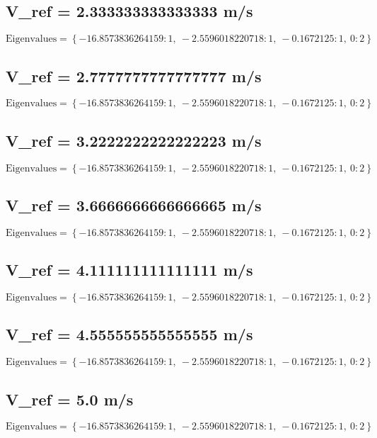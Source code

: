 \documentclass{article}
\begin{document}
\subsection*{V_ref = 2.333333333333333 m/s}
\begin{equation}
\text{Eigenvalues} = \left\{ -16.8573836264159 : 1, \  -2.5596018220718 : 1, \  -0.1672125 : 1, \  0 : 2\right\}
\end{equation}
\subsection*{V_ref = 2.7777777777777777 m/s}
\begin{equation}
\text{Eigenvalues} = \left\{ -16.8573836264159 : 1, \  -2.5596018220718 : 1, \  -0.1672125 : 1, \  0 : 2\right\}
\end{equation}
\subsection*{V_ref = 3.2222222222222223 m/s}
\begin{equation}
\text{Eigenvalues} = \left\{ -16.8573836264159 : 1, \  -2.5596018220718 : 1, \  -0.1672125 : 1, \  0 : 2\right\}
\end{equation}
\subsection*{V_ref = 3.6666666666666665 m/s}
\begin{equation}
\text{Eigenvalues} = \left\{ -16.8573836264159 : 1, \  -2.5596018220718 : 1, \  -0.1672125 : 1, \  0 : 2\right\}
\end{equation}
\subsection*{V_ref = 4.111111111111111 m/s}
\begin{equation}
\text{Eigenvalues} = \left\{ -16.8573836264159 : 1, \  -2.5596018220718 : 1, \  -0.1672125 : 1, \  0 : 2\right\}
\end{equation}
\subsection*{V_ref = 4.555555555555555 m/s}
\begin{equation}
\text{Eigenvalues} = \left\{ -16.8573836264159 : 1, \  -2.5596018220718 : 1, \  -0.1672125 : 1, \  0 : 2\right\}
\end{equation}
\subsection*{V_ref = 5.0 m/s}
\begin{equation}
\text{Eigenvalues} = \left\{ -16.8573836264159 : 1, \  -2.5596018220718 : 1, \  -0.1672125 : 1, \  0 : 2\right\}
\end{equation}
\end{document}
